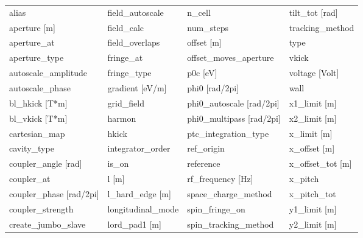  \begin{tabular}{llll} \toprule
alias                          & field_autoscale                & n_cell                         & tilt_tot [rad]                 \\
aperture [m]                   & field_calc                     & num_steps                      & tracking_method                \\
aperture_at                    & field_overlaps                 & offset [m]                     & type                           \\
aperture_type                  & fringe_at                      & offset_moves_aperture          & vkick                          \\
autoscale_amplitude            & fringe_type                    & p0c [eV]                       & voltage [Volt]                 \\
autoscale_phase                & gradient [eV/m]                & phi0 [rad/2pi]                 & wall                           \\
bl_hkick [T*m]                 & grid_field                     & phi0_autoscale [rad/2pi]       & x1_limit [m]                   \\
bl_vkick [T*m]                 & harmon                         & phi0_multipass [rad/2pi]       & x2_limit [m]                   \\
cartesian_map                  & hkick                          & ptc_integration_type           & x_limit [m]                    \\
cavity_type                    & integrator_order               & ref_origin                     & x_offset [m]                   \\
coupler_angle [rad]            & is_on                          & reference                      & x_offset_tot [m]               \\
coupler_at                     & l [m]                          & rf_frequency [Hz]              & x_pitch                        \\
coupler_phase [rad/2pi]        & l_hard_edge [m]                & space_charge_method            & x_pitch_tot                    \\
coupler_strength               & longitudinal_mode              & spin_fringe_on                 & y1_limit [m]                   \\
create_jumbo_slave             & lord_pad1 [m]                  & spin_tracking_method           & y2_limit [m]                   \\

\end{tabular}
